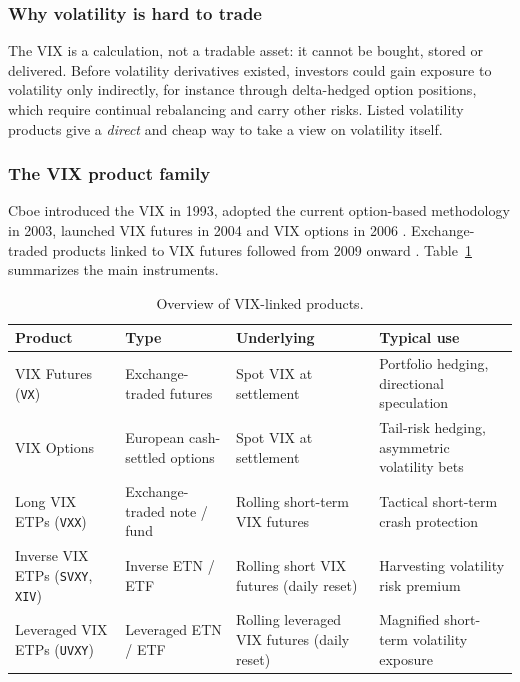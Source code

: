 \subsubsection{Why volatility is hard to trade}

The VIX is a calculation, not a tradable asset: it cannot be bought, stored or delivered. Before volatility derivatives existed, investors could gain exposure to volatility only indirectly, for instance through delta-hedged option positions, which require continual rebalancing and carry other risks. Listed volatility products give a \emph{direct} and cheap way to take a view on volatility itself.

\subsubsection{The VIX product family}

Cboe introduced the VIX in 1993, adopted the current option-based methodology in 2003, launched VIX futures in 2004 and VIX options in 2006 \cite{cboewp}. Exchange-traded products linked to VIX futures followed from 2009 onward \cite{vxx}. Table~\ref{tab:products} summarizes the main instruments.

\begin{table}[H]
\centering
\small
\begin{tabular}{@{}p{3.4cm}p{3.6cm}p{3.6cm}p{4.2cm}@{}}
\toprule
\textbf{Product} & \textbf{Type} & \textbf{Underlying} & \textbf{Typical use}\\
\midrule
VIX Futures (\texttt{VX}) & Exchange-traded futures & Spot VIX at settlement & Portfolio hedging, directional speculation\\
\addlinespace
VIX Options & European cash-settled options & Spot VIX at settlement & Tail-risk hedging, asymmetric volatility bets\\
\addlinespace
Long VIX ETPs (\texttt{VXX}) & Exchange-traded note / fund & Rolling short-term VIX futures & Tactical short-term crash protection\\
\addlinespace
Inverse VIX ETPs (\texttt{SVXY}, \texttt{XIV}) & Inverse ETN / ETF & Rolling short VIX futures (daily reset) & Harvesting volatility risk premium\\
\addlinespace
Leveraged VIX ETPs (\texttt{UVXY}) & Leveraged ETN / ETF & Rolling leveraged VIX futures (daily reset) & Magnified short-term volatility exposure\\
\bottomrule
\end{tabular}
\caption{Overview of VIX-linked products.}
\label{tab:products}
\end{table}

